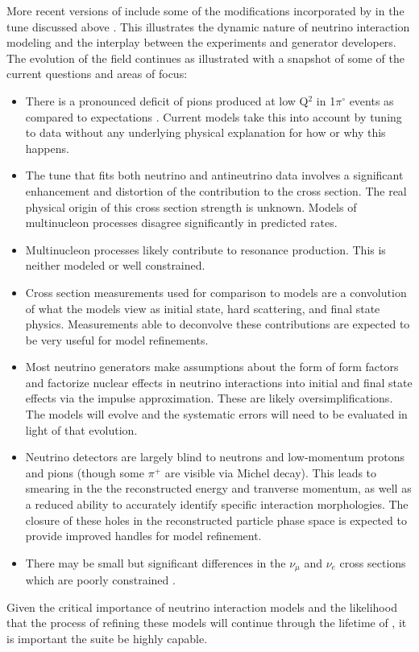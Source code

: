 More recent versions of  include some of the modifications incorporated by  in the tune discussed above \cite{Alam:2015nkk}.  This illustrates the dynamic nature of neutrino interaction modeling and the interplay between the experiments and generator developers.  The evolution of the field continues as illustrated with a snapshot of some of the current questions and areas of focus:
\begin{itemize}
    \item There is a pronounced deficit of pions produced at low Q$^{2}$ in 1$\pi^{\circ}$ events as compared to expectations \cite{BercellieNUINT2018,Altinok:2017xua,Aliaga:2015wva,McGivern:2016bwh,novaminosPC}.  Current models take this into account by tuning to data without any underlying physical explanation for how or why this happens.
    \item The  tune that fits both neutrino and antineutrino  data involves a significant enhancement and distortion of the  contribution to the cross section.  The real physical origin of this cross section strength is unknown.  Models of multinucleon processes disagree significantly in predicted rates.
    \item Multinucleon processes likely contribute to resonance production.  This is neither modeled or well constrained.
    \item Cross section measurements used for comparison to models are a convolution of what the models view as initial state, hard scattering, and final state physics.   Measurements able to deconvolve these contributions are expected to be very useful for model refinements.  
    \item Most neutrino generators make assumptions about the form of form factors and factorize nuclear effects in neutrino interactions into initial and final state effects via the impulse approximation.  These are likely oversimplifications.  The models will evolve and the systematic errors will need to be evaluated in light of that evolution. 
    \item  Neutrino detectors are largely blind to neutrons and low-momentum protons and pions (though some $\pi^{+}$ are visible via Michel decay).  This leads to smearing in the the reconstructed energy and tranverse momentum, as well as a reduced ability to accurately identify specific interaction morphologies.  The closure of these holes in the reconstructed particle phase space is expected to provide improved handles for model refinement.
    \item There may be small but significant differences in the $\nu_{\mu}$ and $\nu_{e}$  cross sections which are poorly constrained \cite{Day-McFarland:2012}.
\end{itemize}
Given the critical importance of neutrino interaction models and the likelihood that the process of refining these models will continue through the lifetime of , it is important the    suite be highly capable.   

